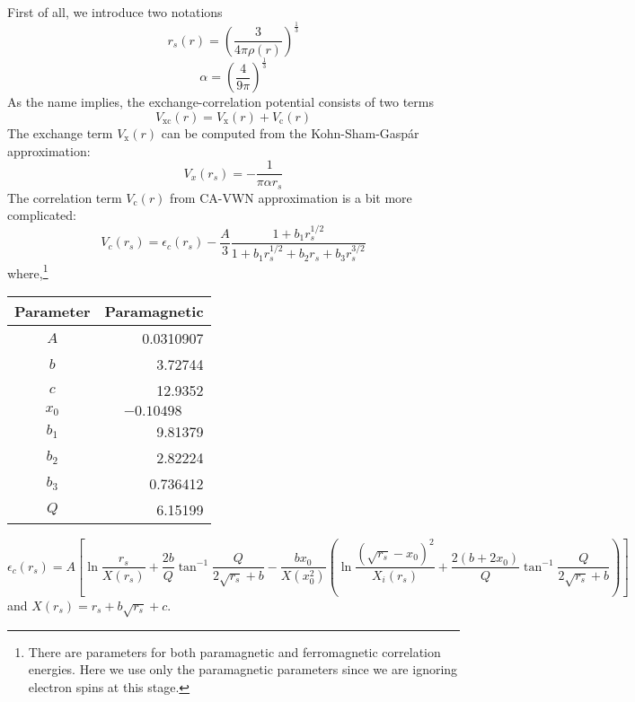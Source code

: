 First of all, we introduce two notations
\begin{equation} \label{eq:rs}
r_s(r) = \left(\frac{3}{4\pi\rho(r)}\right)^{\frac{1}{3}}
\end{equation}
\begin{equation} \label{eq:alpha}
\alpha = \left(\frac{4}{9\pi}\right)^{\frac{1}{3}}
\end{equation}
%
As the name implies, the exchange-correlation potential consists of two terms
\begin{equation} \label{eq:VxVc}
V_{\text{xc}}(r) = V_{\text{x}}(r) + V_{\text{c}}(r)
\end{equation}
%
The exchange term $V_{\text{x}}(r)$ can be computed from the Kohn-Sham-Gasp\'{a}r
approximation:
\begin{equation} \label{eq:exchange}
V_x(r_s) = -\frac{1}{\pi\alpha r_s}
\end{equation}
%
The correlation term $V_{\text{c}}(r)$ from CA-VWN approximation is a bit more complicated:
\begin{equation} \label{eq:correlation}
V_c(r_s) = \epsilon_c(r_s) - \frac{A}{3}\frac{1+b_1 r_s^{1/2}}{1+b_1 r_s^{1/2} + b_2 r_s + b_3 r_s^{3/2}}
\end{equation}
where,\footnote{There are parameters for both paramagnetic
and ferromagnetic correlation energies. Here we use only the paramagnetic
parameters since we are ignoring electron spins at this stage.}
\begin{center}
\begin{tabular}{ c | r }
  \hline
  Parameter & Paramagnetic \\ \hline
  $A$     &  0.0310907\phantom{0} \\
  $b$     &  3.72744\phantom{000} \\
  $c$     & 12.9352\phantom{0000} \\
  $x_0$   & $-0.10498\phantom{000}$ \\
  $b_1$   &  9.81379\phantom{000} \\
  $b_2$   &  2.82224\phantom{000} \\
  $b_3$   &  0.736412\phantom{00} \\
  $Q$     &  6.15199\phantom{000} \\
  \hline
\end{tabular}
\end{center}
$$ \epsilon_c(r_s) = A\left[ \ln{\frac{r_s}{X(r_s)}} + \frac{2b}{Q}\tan^{-1}{\frac{Q}{2\sqrt{r_s}+b} - \frac{b x_0}{X(x_0^2)}}\left( \ln{\frac{(\sqrt{r_s}-x_0)^2}{X_i(r_s)} + \frac{2(b+2x_0)}{Q}}\tan^{-1}{\frac{Q}{2\sqrt{r_s}+b}} \right) \right] $$
and $X(r_s)=r_s+b\sqrt{r_s}+c$.

